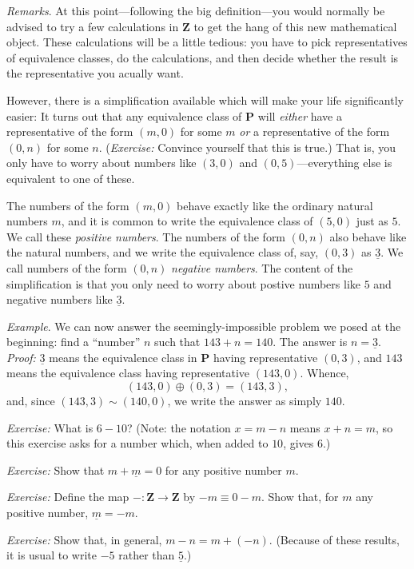 \documentclass[10pt, a4paper, twocolumn]{article}
\newcommand{\set}[1]{\mathbold{#1}}
\newcommand{\pairs}{\set{P}}
\newcommand{\minus}[1]{\underline{#1}}
\begin{document}
\emph{Remarks}. At this point---following the big definition---you would
normally be advised to try a few calculations in $\set{Z}$ to get the
hang of this new mathematical object. These calculations will be a
little tedious: you have to pick representatives of equivalence
classes, do the calculations, and then decide whether the result is
the representative you acually want.

However, there is a simplification available which will make your life
significantly easier: It turns out that any equivalence class of
$\pairs$ will \emph{either} have a representative of the form $(m, 0)$
for some $m$ \emph{or} a representative of the form $(0, n)$ for some
$n$. (\emph{Exercise:} Convince yourself that this is true.) That is,
you only have to worry about numbers like $(3,0)$ and
$(0,5)$---everything else is equivalent to one of these.

The numbers of the form $(m,0)$ behave exactly like the ordinary
natural numbers $m$, and it is common to write the equivalence class
of $(5,0)$ just as $5$. We call these \emph{positive numbers}. The
numbers of the form $(0,n)$ also behave like the natural numbers, and
we write the equivalence class of, say, $(0,3)$ as $\minus{3}$. We
call numbers of the form $(0,n)$ \emph{negative numbers}. The content
of the simplification is that you only need to worry about postive
numbers like $5$ and negative numbers like $\minus{3}$.

\emph{Example}. We can now answer the seemingly-impossible problem we
posed at the beginning: find a ``number'' $n$ such that
$143+n=140$. The answer is $n=\minus{3}$. \emph{Proof:} $\minus{3}$
means the equivalence class in $\pairs$ having representative $(0,3)$,
and $143$ means the equivalence class having representative
$(143,0)$. Whence,
\begin{equation*}
(143,0) \oplus (0,3) = (143,3),
\end{equation*}
and, since $(143,3)\sim(140,0)$, we write the answer as simply $140$.

\emph{Exercise:} What is $6-10$? (Note: the notation $x = m - n$ means
$x+n=m$, so this exercise asks for a number which, when added to $10$,
gives $6$.)

\emph{Exercise:} Show that $m+\minus{m}=0$ for any positive number $m$.

\emph{Exercise:} Define the map $-:\set{Z}\to\set{Z}$ by $-m\equiv 0-m$. Show
that, for $m$ any positive number, $\minus{m}=-m$. 

\emph{Exercise:} Show that, in general, $m-n=m+(-n)$. (Because of these
results, it is usual to write $-5$ rather than $\minus{5}$.)
\end{document}
